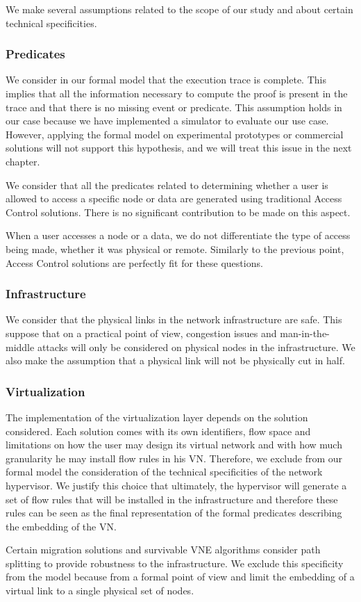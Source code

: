 We make several assumptions related to the scope of our study and about certain technical specificities.

\subsubsection{Predicates}
We consider in our formal model that the execution trace is complete.
This implies that all the information necessary to compute the proof is present in the trace and that there is no missing event or predicate.
This assumption holds in our case because we have implemented a simulator to evaluate our use case. However, applying the formal model on experimental prototypes or commercial solutions will not support this hypothesis, and we will treat this issue in the next chapter.

We consider that all the predicates related to determining whether a user is allowed to access a specific node or data are generated using traditional Access Control solutions.
There is no significant contribution to be made on this aspect.

When a user accesses a node or a data, we do not differentiate the type of access being made, whether it was physical or remote.
Similarly to the previous point, Access Control solutions are perfectly fit for these questions.


\subsubsection{Infrastructure}
We consider that the physical links in the network infrastructure are safe.
This suppose that on a practical point of view, congestion issues and man-in-the-middle attacks will only be considered on physical nodes in the infrastructure.
We also make the assumption that a physical link will not be physically cut in half.

\subsubsection{Virtualization}
The implementation of the virtualization layer depends on the solution considered.
Each solution comes with its own identifiers, flow space and limitations on how the user may design its virtual network and with how much granularity he may install flow rules in his VN. Therefore, we exclude from our formal model the consideration of the technical specificities of the network hypervisor.
We justify this choice that ultimately, the hypervisor will generate a set of flow rules that will be installed in the infrastructure and therefore these rules can be seen as the final representation of the formal predicates describing the embedding of the VN.

Certain migration solutions and survivable VNE algorithms consider path splitting to provide robustness to the infrastructure.
We exclude this specificity from the model because from a formal point of view and limit the embedding of a virtual link to a single physical set of nodes.

